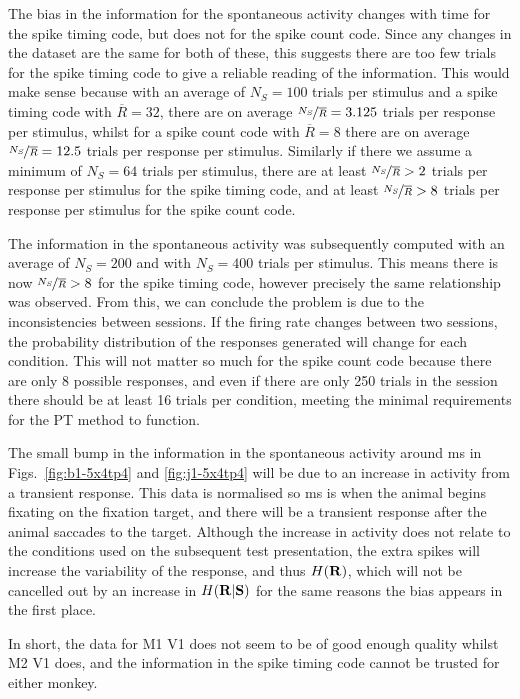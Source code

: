 The bias in the information for the spontaneous activity changes with time for the spike timing code, but does not for the spike count code.
Since any changes in the dataset are the same for both of these, this suggests there are too few trials for the spike timing code to give a reliable reading of the information. This would make sense because with an average of $N_S = 100$ trials per stimulus and a spike timing code with $\overline{R} = 32$, there are
on average $\nicefrac{N_S}{\overline{R}} = 3.125$ trials per response per stimulus,
whilst for a spike count code with $\overline{R} = 8$ there are on average $\nicefrac{N_S}{\overline{R}} = 12.5$ trials per response per stimulus.
Similarly if there we assume a minimum of $N_S = 64$ trials per stimulus, there are
at least $\nicefrac{N_S}{\overline{R}} > 2$ trials per response per stimulus for the spike timing code, and
at least $\nicefrac{N_S}{\overline{R}} > 8$ trials per response per stimulus for the spike count code.

The information in the spontaneous activity was subsequently computed with an average of $N_S = 200$ and with $N_S = 400$ trials per stimulus.
This means there is now $\nicefrac{N_S}{\overline{R}} > 8$ for the spike timing code, however precisely the same relationship was observed.
From this, we can conclude the problem is due to the inconsistencies between sessions. If the firing rate changes between two sessions, the probability distribution of the responses generated will change for each condition. This will not matter so much for the spike count code because there are only 8 possible responses, and even if there are only 250 trials in the session there should be at least 16 trials per condition, meeting the minimal requirements for the PT method to function.

The small bump in the information in the spontaneous activity around \unit[50]{ms} in Figs.~\ref{fig:b1-5x4tp4} and \ref{fig:j1-5x4tp4} will be due to an increase in activity from a transient response. This data is normalised so \unit[0]{ms} is when the animal begins fixating on the fixation target, and there will be a transient response after the animal saccades to the target. Although the increase in activity does not relate to the conditions used on the subsequent test presentation, the extra spikes will increase the variability of the response, and thus $H(\mathbf{R})$, which will not be cancelled out by an increase in $H(\mathbf{R}|\mathbf{S})$ for the same reasons the bias appears in the first place.

In short, the data for M1 V1 does not seem to be of good enough quality whilst M2 V1 does, and the information in the spike timing code cannot be trusted for either monkey.


